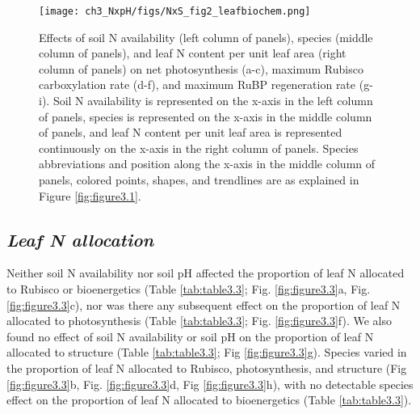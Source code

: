     \newpage
    \begin{figure}
        \texttt{[image: ch3\_NxpH/figs/NxS\_fig2\_leafbiochem.png]}
        \centering
        \caption[Effects of soil N availability, species, and leaf N content leaf biochemistry]{Effects of soil N availability (left column of panels), species (middle column of panels), and leaf N content per unit leaf area (right column of panels) on net photosynthesis (a-c), maximum Rubisco carboxylation rate (d-f), and maximum RuBP regeneration rate (g-i). Soil N availability is represented on the x-axis in the left column of panels, species is represented on the x-axis in the middle column of panels, and leaf N content per unit leaf area is represented continuously on the x-axis in the right column of panels. Species abbreviations and position along the x-axis in the middle column of panels, colored points, shapes, and trendlines are as explained in Figure \ref{fig:figure3.1}.}
        \label{fig:figure3.2}
    \end{figure}
    \clearpage

    \newpage
    \subsection{\textit{Leaf N allocation}}
    Neither soil N availability nor soil pH affected the proportion of leaf N allocated to Rubisco or bioenergetics (Table \ref{tab:table3.3}; Fig. \ref{fig:figure3.3}a, Fig. \ref{fig:figure3.3}c), nor was there any subsequent effect on the proportion of leaf N allocated to photosynthesis (Table \ref{tab:table3.3}; Fig. \ref{fig:figure3.3}f). We also found no effect of soil N availability or soil pH on the proportion of leaf N allocated to structure (Table \ref{tab:table3.3}; Fig \ref{fig:figure3.3}g). Species varied in the proportion of leaf N allocated to Rubisco, photosynthesis, and structure (Fig \ref{fig:figure3.3}b, Fig. \ref{fig:figure3.3}d, Fig \ref{fig:figure3.3}h), with no detectable species effect on the proportion of leaf N allocated to bioenergetics (Table \ref{tab:table3.3}).
    \clearpage

